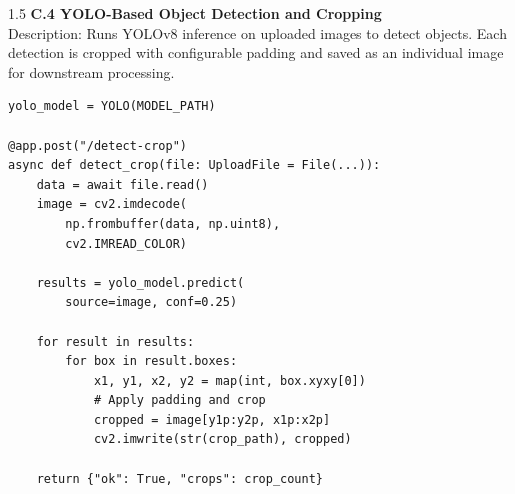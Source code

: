 \begin{spacing}{1.5}
\noindent \textbf{C.4 YOLO-Based Object Detection and Cropping}\\
Description: Runs YOLOv8 inference on uploaded images to detect objects. Each detection is cropped with configurable padding and saved as an individual image for downstream processing.
\begin{verbatim}
yolo_model = YOLO(MODEL_PATH)

@app.post("/detect-crop")
async def detect_crop(file: UploadFile = File(...)):
    data = await file.read()
    image = cv2.imdecode(
        np.frombuffer(data, np.uint8),
        cv2.IMREAD_COLOR)

    results = yolo_model.predict(
        source=image, conf=0.25)

    for result in results:
        for box in result.boxes:
            x1, y1, x2, y2 = map(int, box.xyxy[0])
            # Apply padding and crop
            cropped = image[y1p:y2p, x1p:x2p]
            cv2.imwrite(str(crop_path), cropped)

    return {"ok": True, "crops": crop_count}
\end{verbatim}



\end{spacing}
